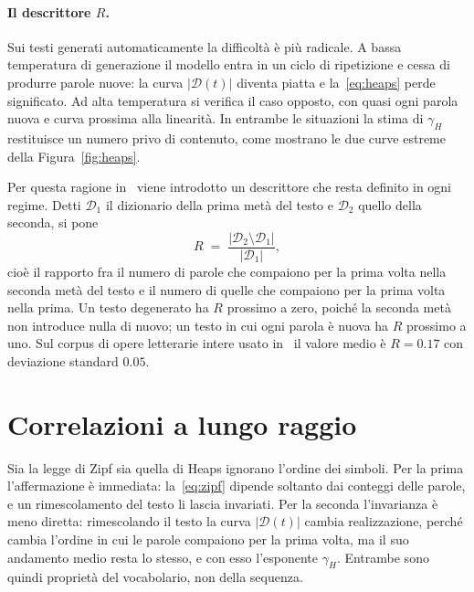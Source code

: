 \paragraph{Il descrittore $R$.}
Sui testi generati automaticamente la difficoltà è più radicale. A bassa
temperatura di generazione il modello entra in un ciclo di ripetizione e cessa
di produrre parole nuove: la curva $|\mathcal{D}(t)|$ diventa piatta e
la~\eqref{eq:heaps} perde significato. Ad alta temperatura si verifica il caso
opposto, con quasi ogni parola nuova e curva prossima alla linearità. In
entrambe le situazioni la stima di $\gamma_H$ restituisce un numero privo di
contenuto, come mostrano le due curve estreme della Figura~\ref{fig:heaps}.

Per questa ragione in~\cite{mikhaylovskiy2025zipf} viene introdotto un
descrittore che resta definito in ogni regime. Detti $\mathcal{D}_1$ il
dizionario della prima metà del testo e $\mathcal{D}_2$ quello della seconda, si
pone
\begin{equation}
  R \;=\; \frac{|\mathcal{D}_2 \setminus \mathcal{D}_1|}{|\mathcal{D}_1|},
  \label{eq:R}
\end{equation}
cioè il rapporto fra il numero di parole che compaiono per la prima volta nella
seconda metà del testo e il numero di quelle che compaiono per la prima volta
nella prima. Un testo degenerato ha $R$ prossimo a zero, poiché la seconda metà
non introduce nulla di nuovo; un testo in cui ogni parola è nuova ha $R$
prossimo a uno. Sul corpus di opere letterarie intere usato
in~\cite{mikhaylovskiy2025zipf} il valore medio è $R = 0.17$ con deviazione
standard $0.05$.


\section{Correlazioni a lungo raggio}
\label{sec:lrc}

Sia la legge di Zipf sia quella di Heaps ignorano l'ordine dei simboli. Per la
prima l'affermazione è immediata: la~\eqref{eq:zipf} dipende soltanto dai
conteggi delle parole, e un rimescolamento del testo li lascia invariati. Per la
seconda l'invarianza è meno diretta: rimescolando il testo la curva
$|\mathcal{D}(t)|$ cambia realizzazione, perché cambia l'ordine in cui le
parole compaiono per la prima volta, ma il suo andamento medio resta lo stesso, e con esso l'esponente
$\gamma_H$. Entrambe sono quindi proprietà del vocabolario, non della sequenza.

